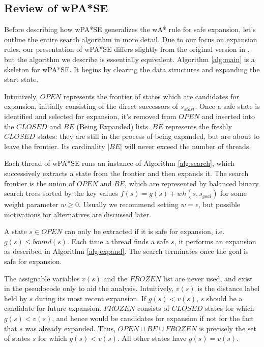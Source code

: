 \documentclass[letterpaper]{article}
\begin{document}
\subsection{Review of wPA*SE}

Before describing how wPA*SE generalizes the wA* rule for safe expansion, let's outline the entire search algorithm in more detail. Due to our focus on expansion rules, our presentation of wPA*SE differs slightly from the original version in \cite{phillips2014pa}, but the algorithm we describe is essentially equivalent. Algorithm \ref{alg:main} is a skeleton for wPA*SE. It begins by clearing the data structures and expanding the start state.

Intuitively, $OPEN$ represents the frontier of states which are candidates for expansion, initially consisting of the direct successors of $s_{start}$. Once a safe state is identified and selected for expansion, it's removed from $OPEN$ and inserted into the $CLOSED$ and $BE$ (Being Expanded) lists. $BE$ represents the freshly $CLOSED$ states: they are still in the process of being expanded, but are about to leave the frontier. Its cardinality $|BE|$ will never exceed the number of threads.

Each thread of wPA*SE runs an instance of Algorithm \ref{alg:search}, which successively extracts a state from the frontier and then expands it. The search frontier is the union of $OPEN$ and $BE$, which are represented by balanced binary search trees sorted by the key values $f(s) = g(s) + wh(s,s_{goal})$ for some weight parameter $w\ge 0$. Usually we recommend setting $w=\epsilon$, but possible motivations for alternatives are discussed later.

A state $s\in OPEN$ can only be extracted if it is safe for expansion, i.e. $g(s)\le bound(s)$. Each time a thread finds a safe $s$, it performs an expansion as described in Algorithm \ref{alg:expand}. The search terminates once the goal is safe for expansion.

The assignable variables $v(s)$ and the $FROZEN$ list are never used, and exist in the pseudocode only to aid the analysis. Intuitively, $v(s)$ is the distance label held by $s$ during its most recent expansion. If $g(s) < v(s)$, $s$ should be a candidate for future expansion. $FROZEN$ consists of $CLOSED$ states for which $g(s) < v(s)$, and hence would be candidates for expansion if not for the fact that $s$ was already expanded. Thus, $OPEN\cup BE\cup FROZEN$ is precisely the set of states $s$ for which $g(s) < v(s)$. All other states have $g(s) = v(s)$.
\end{document}
